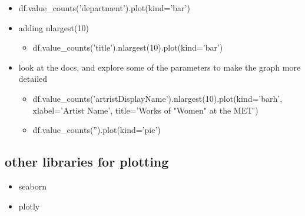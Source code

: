 \documentclass[11pt]{article}
\begin{document}
\begin{itemize}
\begin{itemize}
\item df.value\_counts('department').plot(kind='bar')
\item adding nlargest(10)
\begin{itemize}
\item df.value\_counts('title').nlargest(10).plot(kind='bar')
\end{itemize}
\item look at the docs, and explore some of the parameters to make the
graph more detailed
\begin{itemize}
\item df.value\_counts('artristDisplayName').nlargest(10).plot(kind='barh',
xlabel='Artist Name', title='Works of "Women" at the MET')
\item df.value\_counts('').plot(kind='pie')
\end{itemize}
\end{itemize}
\end{itemize}

\subsection{other libraries for plotting}
\label{sec:org5a4d1f2}
\begin{itemize}
\item seaborn
\item plotly
\end{itemize}
\end{document}
